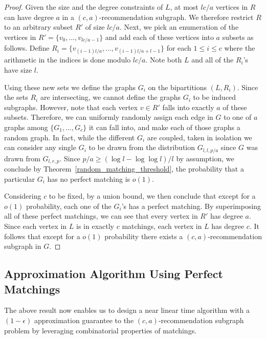 \begin{proof}
Given the size and the degree constraints of $L$, at most $lc/a$
vertices in $R$ can have degree $a$ in a $(c,a)$-recommendation subgraph. We
therefore restrict $R$ to an arbitrary subset $R'$ of size $lc/a$.
Next, we pick an enumeration of the vertices in $R'=\{v_0,\ldots, v_{lc/a-1}\}$
and add each of these vertices into $a$ subsets as follows. Define
$R_i = \{v_{(i-1)l/a}, \ldots, v_{(i-1)l/a+l-1}\}$ for each $1\leq i\leq c$ where
the arithmetic in the indices is done modulo $lc/a$. Note both $L$ and all of
the $R_i$'s have size $l$. \vs

Using these new sets we define the graphs $G_i$ on the bipartitions
$(L, R_i)$. Since the sets $R_i$ are intersecting, we cannot define the
graphs $G_i$ to be induced subgraphs. However, note that each vertex $v\in R'$
falls into exactly $a$ of these subsets. Therefore, we can uniformly randomly assign each edge in $G$ to one of $a$ graphs among $\{G_1,\ldots, G_c\}$ it can fall into,
and make each of those graphs a random graph. In fact, while the different
$G_i$ are coupled, taken in isolation we can consider any single $G_i$ to be
drawn from the distribution $G_{l,l,p/a}$ since $G$ was drawn from $G_{l,r,p}$.
Since $p/a \geq (\log l - \log\log l)/l$ by assumption, we conclude by
Theorem~\ref{random_matching_threshold}, the probability that a particular
$G_i$ has no perfect matching is $o(1)$. \vs

Considering $c$ to be fixed, by a union bound, we then conclude that except
for a $o(1)$ probability, each one of the $G_i$'s has a perfect matching. By
superimposing all of these perfect matchings, we can see that every vertex in
$R'$ has degree $a$. Since each vertex in $L$ is in exactly $c$ matchings, each
vertex in $L$ has degree $c$. It follows that except for a $o(1)$ probability
there exists a $(c,a)$-recommendation subgraph in $G$.
\end{proof}

\subsection{Approximation Algorithm Using Perfect Matchings}

The above result now enables us to design a near linear time
algorithm with a $(1-\epsilon)$ approximation guarantee
to the $(c,a)$-recommendation subgraph problem by leveraging
combinatorial properties of matchings.

